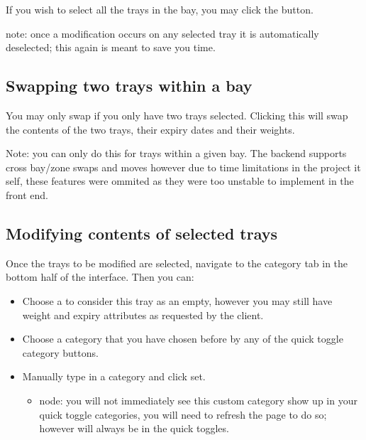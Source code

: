 \documentclass[letterpaper,10pt,english]{sphinxmanual}
\let\oldsubsection\subsection
\renewcommand{\subsection}{\needspace{6\baselineskip}\oldsubsection}
\begin{document}
\begin{DUlineblock}{0em}
\item[] If you wish to select all the trays in the bay, you may click the
 button.
\item[] note: once a modification occurs on any selected tray it is
automatically de\sphinxhyphen{}selected; this again is meant to save you time.
\end{DUlineblock}


\subsection{Swapping two trays within a bay}
\label{\detokenize{docs/ui/stocktaking:swapping-two-trays-within-a-bay}}
You may only swap if you only have two trays selected. Clicking this
will swap the contents of the two trays, their expiry dates and their
weights.

Note: you can only do this for trays within a given bay. The backend
supports cross bay/zone swaps and moves however due to time limitations
in the project it self, these features were ommited as they were too
unstable to implement in the front end.


\subsection{Modifying contents of selected trays}
\label{\detokenize{docs/ui/stocktaking:modifying-contents-of-selected-trays}}
Once the trays to be modified are selected, navigate to the category tab
in the bottom half of the interface. Then you can:
\begin{itemize}
\item {} 
Choose a  to consider this tray as an empty, however you may
still have weight and expiry attributes as requested by the client.

\item {} 
Choose a category that you have chosen before by any of the quick
toggle category buttons.

\item {} 
Manually type in a category and click set.
\begin{itemize}
\item {} 
node: you will not immediately see this custom category show up in
your quick toggle categories, you will need to refresh the page to
do so; however  will always be in the quick toggles.

\end{itemize}

\end{itemize}
\end{document}
